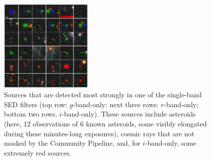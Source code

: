 \documentclass[letterpaper,preprint]{aastex62}
\begin{document}
\begin{figure}
  \begin{center}
    \includegraphics[width=0.4\textwidth]{singleband}
    \caption{Sources that are detected most strongly in one of the
      single-band SED filters (top row: $g$-band-only; next three
      rows: $r$-band-only; bottom two rows, $i$-band-only).  These
      sources include asteroids (here, 12 observations of 6 known
      asteroids, some visibly elongated during these minutes-long
      exposures), cosmic rays that are not masked by the Community
      Pipeline, and, for $i$-band-only, some extremely red sources.
      \label{fig:oneband}}
  \end{center}
\end{figure}
\end{document}
